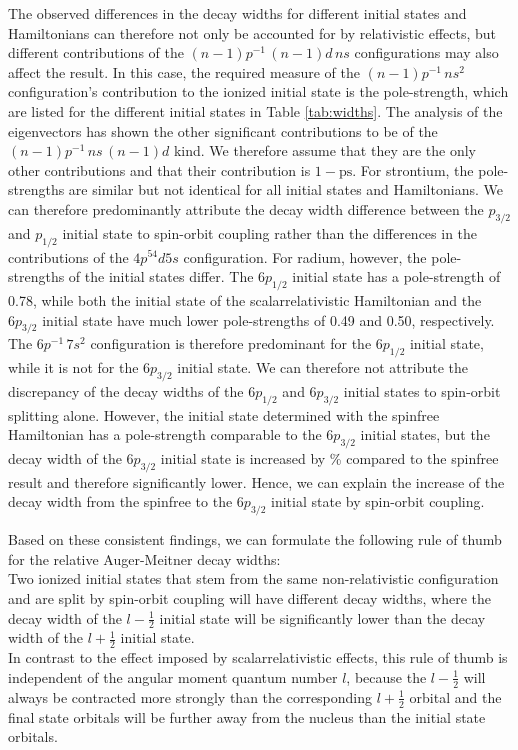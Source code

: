 The observed differences in the decay widths for different initial states and
Hamiltonians can therefore not only be accounted for by relativistic
effects, but different contributions of the $(n-1)p^{-1} \,(n-1)d \, ns$
configurations may also affect the result.
In this case, the required measure of the $(n-1)p^{-1} \, ns^2$ configuration's
contribution to the ionized initial state is the pole-strength,
which are listed for the different initial states in Table \ref{tab:widths}.
The analysis of the eigenvectors has shown the other significant contributions
to be of the $(n-1)p^{-1} \,ns \, (n-1)d$ kind. We therefore assume that
they are the only other contributions and that their contribution is $1-\text{ps}$.
For strontium, the pole-strengths are similar but not identical for all initial
states and Hamiltonians. 
We can therefore predominantly attribute the decay width difference between the
$p_{3/2}$ and $p_{1/2}$ initial state to spin-orbit coupling rather than the
differences in the contributions of the $4p^54d5s$ configuration.
For radium, however, the pole-strengths of the initial states differ.
The $6p_{1/2}$ initial state has a pole-strength of 0.78, while both the
initial state of the scalarrelativistic Hamiltonian and the $6p_{3/2}$ initial
state have much lower pole-strengths of 0.49 and 0.50, respectively.
The $6p^{-1} \,7s^2$ configuration is therefore predominant for the $6p_{1/2}$
initial state, while it is not for the $6p_{3/2}$ initial state.
We can therefore not attribute the discrepancy of the decay widths of the
$6p_{1/2}$ and $6p_{3/2}$ initial states to spin-orbit splitting alone.
However, the initial state determined with the spinfree
Hamiltonian has a pole-strength comparable to the $6p_{3/2}$ initial states,
but the decay width of the $6p_{3/2}$ initial state is increased by \unit[236]{\%}
compared to the spinfree result and therefore
significantly lower.
Hence, we can explain the increase of the decay width from the spinfree to the
$6p_{3/2}$ initial state by spin-orbit coupling.


Based on these consistent findings, we can formulate the following rule of thumb for
the relative Auger-Meitner decay widths:\\
Two ionized initial states that stem from the same non-relativistic configuration and
are split by spin-orbit coupling will have different decay widths, where the decay width
of the $l-\frac12$ initial state will be significantly lower than the decay width of
the $l + \frac12$ initial state.\\
In contrast to the effect imposed by scalarrelativistic effects, this rule
of thumb is independent of the angular moment quantum number $l$, because the
$l-\frac12$ will always be contracted more strongly than the corresponding
$l+\frac12$ orbital and the final state orbitals will be further away from
the nucleus than the initial state orbitals.

